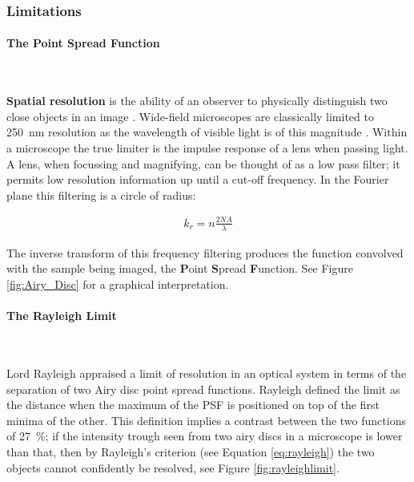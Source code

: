\subsubsection{Limitations}

\paragraph{The Point Spread Function}~

\textbf{Spatial resolution} is the ability of an observer to physically distinguish two close objects in an image \cite{Tsekenis2015}. Wide-field microscopes are classically limited to \SI{250}{\nano\meter} resolution as the wavelength of visible light is of this magnitude \cite{Bradbury1998}. Within a microscope the true limiter is the impulse response of a lens when passing light. A lens, when focussing and magnifying, can be thought of as a low pass filter; it permits low resolution information up until a cut-off frequency. In the Fourier plane this filtering is a circle of radius:

\begin{align}
k_r = n\frac{2 NA}{\lambda}
\end{align}

The inverse transform of this frequency filtering produces the function convolved with the sample being imaged, the \textbf{P}oint \textbf{S}pread \textbf{F}unction. See Figure \ref{fig:Airy_Disc} for a graphical interpretation.

\paragraph{The Rayleigh Limit}~

Lord Rayleigh appraised a limit of resolution in an optical system in terms of the separation of two Airy disc point spread functions. Rayleigh defined the limit as the distance when the maximum of the PSF is positioned on top of the first minima of the other. This definition implies a contrast between the two functions of \SI{27}{\percent}; if the intensity trough seen from two airy discs in a microscope is lower than that, then by Rayleigh's criterion (see Equation \ref{eq:rayleigh}) the two objects cannot confidently be resolved, see Figure \ref{fig:rayleighlimit}.

